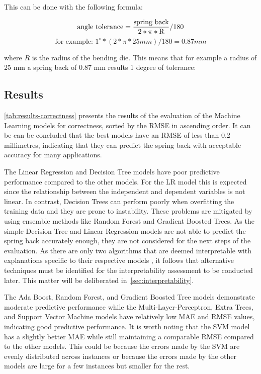 This can be done with the following formula:


\begin{tcolorbox}[arc=0pt,boxrule=0.5pt]
    \begin{equation}
        \label{eq:tolerance}
        \text{\text{angle tolerance}} = \frac{\text{spring back}}{2 * \pi * \text{R}} / 180
    \end{equation}
    \begin{equation}
        \text{for example: } 1^\circ * (2 * \pi * 25 mm) / 180 = 0.87 mm
    \end{equation}
\end{tcolorbox}

where $R$ is the radius of the bending die.
This means that for example a radius of 25 mm a spring back of 0.87 mm results 1 degree of tolerance:

\subsection{Results}\label{subsec:results}
\cref{tab:results-correctness} presents the results of the evaluation of the Machine Learning models for
correctness, sorted by the RMSE in ascending order.
It can be can be concluded that the best models have an RMSE of less than 0.2 millimetres, indicating that they can
predict the spring back with acceptable accuracy for many applications.

The Linear Regression and Decision Tree models have poor predictive performance compared to the other models.
For the \ac{LR} model this is expected since the relationship between the independent and dependent variables is
not linear.
In contrast, Decision Trees can perform poorly when overfitting the training data and they are prone to
instability.
These problems are mitigated by using ensemble methods like Random Forest and Gradient Boosted Trees.
As the simple Decision Tree and Linear Regression models are not able to predict the spring back accurately enough,
they are not considered for the next steps of the evaluation.
As there are only two algorithms that are deemed interpretable with explanations specific to their respective models
, it follows that alternative techniques must be identified for the interpretability assessment to be conducted later.
This matter will be deliberated in~\cref{sec:interpretability}.

The Ada Boost, Random Forest, and Gradient Boosted Tree models demonstrate moderate predictive
performance while the Multi-Layer-Perceptron, Extra Trees, and Support Vector Machine models have relatively low MAE
and RMSE values, indicating good predictive performance.
It is worth noting that the SVM model has a slightly better MAE while still maintaining a comparable RMSE compared
to the other models.
This could be because the errors made by the SVM are evenly distributed across instances or
because the errors made by the other models are large for a few instances but smaller for the rest.

